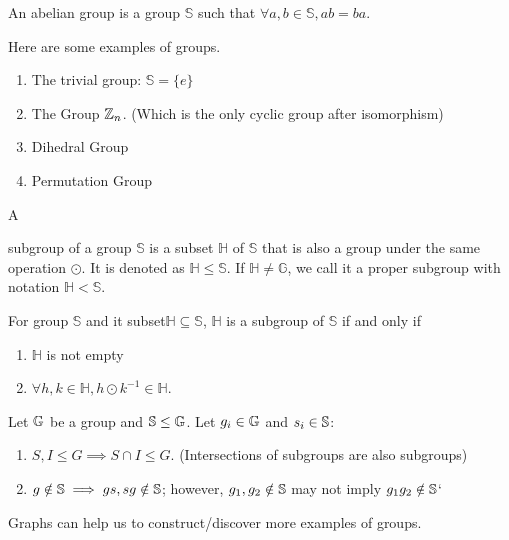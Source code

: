 \documentclass[../note.tex]{subfiles}
\begin{document}
\begin{definition}
	An abelian group is a group $\mathbb{S}$ such that $\forall a, b \in \mathbb{S}, a  b = b  a$.
\end{definition}

Here are some examples of groups. 
\begin{enumerate}
	\item The trivial group: $\mathbb{S}=\{e\}$
	\item The Group $\mathbb{Z}_n$. (Which is the only cyclic group after isomorphism)
	\item Dihedral Group 
	\item Permutation Group
\end{enumerate}

\begin{definition}[Subgroup]
	\hypertarget{def:subgroup}{A} subgroup of a group $\mathbb{S}$ is a subset $\mathbb{H}$ of $\mathbb{S}$ that is also a group under the same operation $\odot$. It is denoted as $ \mathbb{H}\leq \mathbb{S}$. If $\mathbb{H} \neq \mathbb{G}$, we call it a proper subgroup with notation $\mathbb{H}< \mathbb{S}$.
\end{definition}

\begin{theorem} 
	For group $\mathbb{S}$ and it subset$\mathbb{H} \subseteq \mathbb{S}$, $\mathbb{H}$ is a subgroup of $\mathbb{S}$ if and only if 
	\begin{enumerate}
		\item $\mathbb{H}$ is not empty 
		\item $\forall h,k \in \mathbb{H}, h\odot k^{-1} \in \mathbb{H}$.
	\end{enumerate}
\end{theorem}

\begin{theorem} 
	Let $\mathbb{G}$ be a group and $\mathbb{S}\leq \mathbb{G}$. Let $g_i\in \mathbb{G}$ and $s_i \in \mathbb{S}$:
	\begin{enumerate}
		\item $S, I \leq G \implies S\cap I \leq G$. (Intersections of subgroups are also subgroups)
		\item $g\notin \mathbb{S} \implies gs, sg \notin \mathbb{S}$; however, $g_1, g_2 \notin \mathbb{S}$ may not imply $g_1g_2 \notin \mathbb{S}$`
	\end{enumerate}
\end{theorem}

Graphs can help us to construct/discover more examples of groups.
\end{document}
